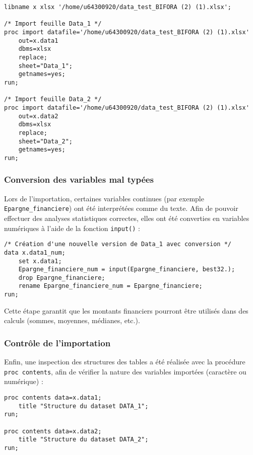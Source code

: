\begin{lstlisting}[caption=Importation des données dans SAS]
libname x xlsx '/home/u64300920/data_test_BIFORA (2) (1).xlsx';

/* Import feuille Data_1 */
proc import datafile='/home/u64300920/data_test_BIFORA (2) (1).xlsx'
    out=x.data1
    dbms=xlsx
    replace;
    sheet="Data_1";
    getnames=yes;
run;

/* Import feuille Data_2 */
proc import datafile='/home/u64300920/data_test_BIFORA (2) (1).xlsx'
    out=x.data2
    dbms=xlsx
    replace;
    sheet="Data_2";
    getnames=yes;
run;
\end{lstlisting}

\subsubsection{Conversion des variables mal typées}
Lors de l'importation, certaines variables continues (par exemple \texttt{Epargne\_financiere}) ont été interprétées comme du texte.  
Afin de pouvoir effectuer des analyses statistiques correctes, elles ont été converties en variables numériques à l'aide de la fonction \texttt{input()} :

\begin{lstlisting}[caption=Conversion de variables texte en numérique]
/* Création d'une nouvelle version de Data_1 avec conversion */
data x.data1_num;
    set x.data1;
    Epargne_financiere_num = input(Epargne_financiere, best32.);
    drop Epargne_financiere;
    rename Epargne_financiere_num = Epargne_financiere;
run;
\end{lstlisting}

Cette étape garantit que les montants financiers pourront être utilisés dans des calculs (sommes, moyennes, médianes, etc.).

\subsubsection{Contrôle de l'importation}
Enfin, une inspection des structures des tables a été réalisée avec la procédure \texttt{proc contents}, afin de vérifier la nature des variables importées (caractère ou numérique) :

\begin{lstlisting}[caption=Inspection des tables SAS]
proc contents data=x.data1;
    title "Structure du dataset DATA_1";
run;

proc contents data=x.data2;
    title "Structure du dataset DATA_2";
run;
\end{lstlisting}

